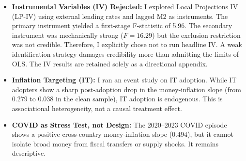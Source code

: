 \documentclass[11pt,a4paper]{article}
\begin{document}
\begin{itemize}
    \item \textbf{Instrumental Variables (IV) Rejected:} I explored Local Projections IV (LP-IV) using external lending rates and lagged M2 as instruments. The primary instrument yielded a first-stage F-statistic of 5.96. The secondary instrument was mechanically strong ($F=16.29$) but the exclusion restriction was not credible. Therefore, I explicitly chose not to run headline IV. A weak identification strategy damages credibility more than admitting the limits of OLS. The IV results are retained solely as a directional appendix.
    \item \textbf{Inflation Targeting (IT):} I ran an event study on IT adoption. While IT adopters show a sharp post-adoption drop in the money-inflation slope (from 0.279 to 0.038 in the clean sample), IT adoption is endogenous. This is associational heterogeneity, not a causal treatment effect.
    \item \textbf{COVID as Stress Test, not Design:} The 2020--2023 COVID episode shows a positive cross-country money-inflation slope ($0.494$), but it cannot isolate broad money from fiscal transfers or supply shocks. It remains descriptive.
\end{itemize}
\end{document}
